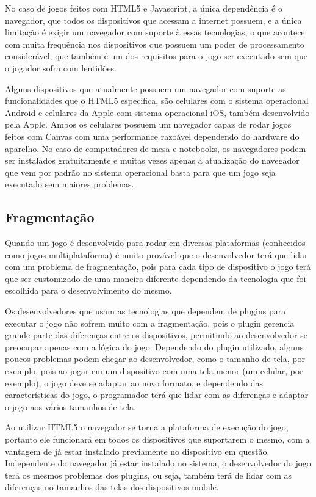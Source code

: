 No caso de jogos feitos com HTML5 e Javascript, a única dependência é
o navegador, que todos os dispositivos que acessam a internet possuem,
e a única limitação é exigir um navegador com suporte à essas
tecnologias, o que acontece com muita frequência nos dispositivos que
possuem um poder de processamento considerável, que também é um dos
requisitos para o jogo ser executado sem que o jogador sofra com
lentidões.

Alguns dispositivos que atualmente possuem um navegador com suporte as
funcionalidades que o HTML5 especifica, são celulares com o sistema
operacional Android e celulares da Apple com sistema operacional iOS,
também desenvolvido pela Apple.
Ambos os celulares possuem um navegador capaz de rodar jogos feitos
com Canvas com uma performance razoável dependendo do hardware do
aparelho. No caso de computadores de mesa e notebooks, os navegadores
podem ser instalados gratuitamente e muitas vezes apenas a atualização
do navegador que vem por padrão no sistema operacional basta para que
um jogo seja executado sem maiores problemas.

\subsection{Fragmentação}

Quando um jogo é desenvolvido para rodar em diversas plataformas
(conhecidos como jogos multiplataforma) é muito provável que o
desenvolvedor terá que lidar com um problema de fragmentação, pois
para cada tipo de dispositivo o jogo terá que ser customizado de uma
maneira diferente dependendo da tecnologia que foi escolhida para o
desenvolvimento do mesmo.

Os desenvolvedores que usam as tecnologias que dependem de plugins para executar o
jogo não sofrem muito com a fragmentação, pois o plugin gerencia
grande parte das diferenças entre os dispositivos, permitindo ao
desenvolvedor se preocupar apenas com a lógica do jogo. Dependendo do
plugin utilizado, alguns poucos problemas podem chegar ao
desenvolvedor, como o tamanho de tela, por exemplo, pois ao jogar em
um dispositivo com uma tela menor (um celular, por exemplo), o jogo
deve se adaptar ao novo formato, e dependendo das características do jogo, o
programador terá que lidar com as diferenças e adaptar o jogo aos
vários tamanhos de tela.

Ao utilizar HTML5 o navegador se torna a plataforma de execução do
jogo, portanto ele funcionará em todos os dispositivos que
suportarem o mesmo, com a vantagem de já estar instalado previamente
no dispositivo em questão.
Independente do navegador já estar instalado no sistema, o
desenvolvedor do jogo terá os mesmos problemas dos plugins, ou seja,
também terá de lidar com as diferenças no tamanhos das telas dos
dispositivos mobile.

